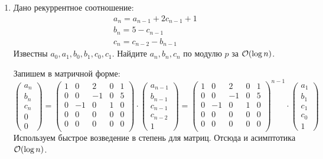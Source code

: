 \begin{enumerate}
  \item {} Дано рекуррентное соотношение:
    $$\begin{matrix}
    a_n = a_{n - 1} + 2c_{n - 1} + 1 \\
    b_n = 5 - c_{n - 1} \\
    c_n = c_{n - 2} - b_{n - 1}
    \end{matrix}$$
    Известны $a_0, a_1, b_0, b_1, c_0, c_1$.
    Найдите $a_n, b_n, c_n$ по модулю $p$ за $\mathcal{O}(\log n)$.
  \begin{solution}
    Запишем в матричной форме:
    \begin{equation}
      \begin{pmatrix}
        a_n \\
        b_n \\
        c_n \\
        0 \\
        0
      \end{pmatrix} =
      \begin{pmatrix}
        1 & 0 & 2 & 0 & 1\\ 
        0 & 0 & -1 & 0 & 5\\ 
        0 & -1 & 0 & 1 & 0\\
        0 & 0 & 0 & 0 & 0\\ 
        0 & 0 & 0 & 0 & 0\\ 
      \end{pmatrix} \cdot
      \begin{pmatrix}
        a_{n-1} \\
        b_{n-1} \\
        c_{n-1} \\
        c_{n-2} \\
        1
      \end{pmatrix} =
      \begin{pmatrix}
        1 & 0 & 2 & 0 & 1\\ 
        0 & 0 & -1 & 0 & 5\\ 
        0 & -1 & 0 & 1 & 0\\ 
        0 & 0 & 0 & 0 & 0\\ 
        0 & 0 & 0 & 0 & 0\\ 
      \end{pmatrix}^{n-1} \cdot
      \begin{pmatrix}
        a_{1} \\
        b_{1} \\
        c_{1} \\
        c_{0} \\
        1
      \end{pmatrix}
    \end{equation}
    Используем быстрое возведение в степень для матриц. Отсюда и асимптотика $\mathcal{O}(\log n)$.
  \end{solution}
    

\end{enumerate}
